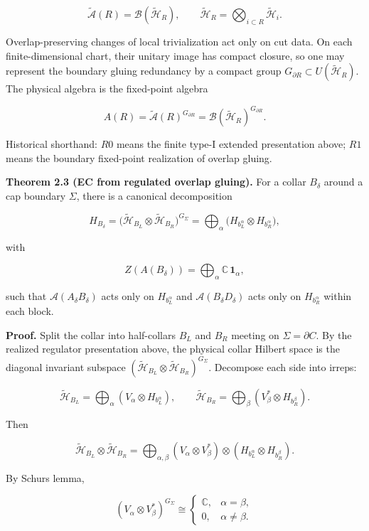 \[
\widetilde{\mathcal A}(R)=\mathcal B(\tilde{\mathcal H}_R),
\qquad
\tilde{\mathcal H}_R=\bigotimes_{i\subset R}\tilde{\mathcal H}_i.
\]

Overlap-preserving changes of local trivialization act only on cut data. On each finite-dimensional chart, their unitary image has compact closure, so one may represent the boundary gluing redundancy by a compact group \(G_{\partial R}\subset U(\tilde{\mathcal H}_R)\). The physical algebra is the fixed-point algebra

\[
A(R)=\widetilde{\mathcal A}(R)^{G_{\partial R}}
=\mathcal B(\tilde{\mathcal H}_R)^{G_{\partial R}}.
\]

Historical shorthand: \(R0\) means the finite type-I extended presentation above; \(R1\) means the boundary fixed-point realization of overlap gluing.

\textbf{Theorem 2.3 (EC from regulated overlap gluing).} For a collar \(B_\delta\) around a cap boundary \(\Sigma\), there is a canonical decomposition

\[
H_{B_\delta} = \bigl(\tilde{\mathcal H}_{B_L}\otimes \tilde{\mathcal H}_{B_R}\bigr)^{G_\Sigma}
= \bigoplus_{\alpha}
\bigl(H_{b_L^{\alpha}} \otimes H_{b_R^{\alpha}}\bigr),
\]

with

\[
Z(A(B_\delta)) = \bigoplus_\alpha \mathbb C\,\mathbf 1_\alpha,
\]

such that \(\mathcal{A}(A_\delta B_\delta)\) acts only on \(H_{b_L^\alpha}\) and \(\mathcal{A}(B_\delta D_\delta)\) acts only on \(H_{b_R^\alpha}\) within each block.

\textbf{Proof.} Split the collar into half-collars \(B_L\) and \(B_R\) meeting on \(\Sigma = \partial C\). By the realized regulator presentation above, the physical collar Hilbert space is the diagonal invariant subspace \((\tilde{\mathcal H}_{B_L} \otimes \tilde{\mathcal H}_{B_R})^{G_\Sigma}\). Decompose each side into irreps:

\[
\tilde{\mathcal H}_{B_L} = \bigoplus_\alpha (V_\alpha \otimes H_{b_L^\alpha}),\qquad
\tilde{\mathcal H}_{B_R} = \bigoplus_\beta (V_\beta^* \otimes H_{b_R^\beta}).
\]

Then

\[
\tilde{\mathcal H}_{B_L} \otimes \tilde{\mathcal H}_{B_R}
= \bigoplus_{\alpha,\beta}
(V_\alpha \otimes V_\beta^*) \otimes
(H_{b_L^\alpha} \otimes H_{b_R^\beta}).
\]

By Schur\textquotesingle s lemma,

\[
(V_\alpha \otimes V_\beta^*)^{G_\Sigma}
\cong
\begin{cases}
\mathbb C, & \alpha=\beta,\\
0, & \alpha\ne\beta.
\end{cases}
\]

